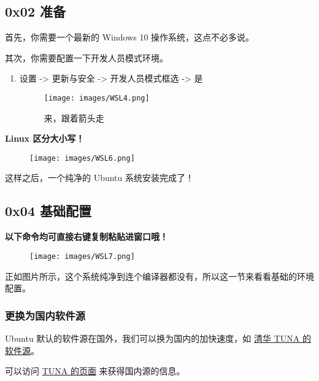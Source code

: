\hr

\subsection{0x02 准备}

首先，你需要一个最新的 Windows 10 操作系统，这点不必多说。  

其次，你需要配置一下开发人员模式环境。

\begin{enumerate}
\item 设置 -> 更新与安全 -> 开发人员模式框选 -> 是
\begin{figure}[h]
\centering
\texttt{[image: images/WSL4.png]} 
\caption{来，跟着箭头走}
\end{figure}     
\end{enumerate}



\textbf{Linux 区分大小写！}

\begin{figure}[h]
\centering
\texttt{[image: images/WSL6.png]} 

\end{figure}

 这样之后，一个纯净的 Ubuntu 系统安装完成了！

\subsection{0x04 基础配置}

 \textbf{ 以下命令均可直接右键复制粘贴进窗口哦！}

\begin{figure}[h]
\centering
\texttt{[image: images/WSL7.png]} 

\end{figure}

 正如图片所示，这个系统纯净到连个编译器都没有，所以这一节来看看基础的环境配置。

\subsubsection{更换为国内软件源}

Ubuntu 默认的软件源在国外，我们可以换为国内的加快速度，如 \href{https://mirrors.tuna.tsinghua.edu.cn/help/ubuntu/}{清华 TUNA 的软件源}。  

可以访问 \href{https://mirrors.tuna.tsinghua.edu.cn/help/ubuntu/}{TUNA 的页面} 来获得国内源的信息。

